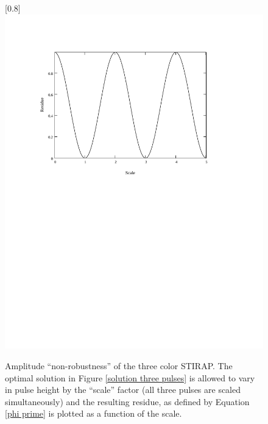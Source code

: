 \begin{figure}
\scalebox{0.8}[0.8]{
\includegraphics[bb=30 415 489 715]
{scale_three-color/scale_three-color.pdf}
}
\caption[Amplitude ``non-robustness'' of the three color STIRAP]{Amplitude ``non-robustness'' of the three color STIRAP. The optimal solution in Figure \ref{solution three pulses} is allowed to vary in pulse height by the ``scale'' factor (all three pulses are scaled simultaneously) and the resulting residue, as defined by Equation \ref{phi prime} is plotted as a function of the scale.}
\label{scale_three-color}
\end{figure}
